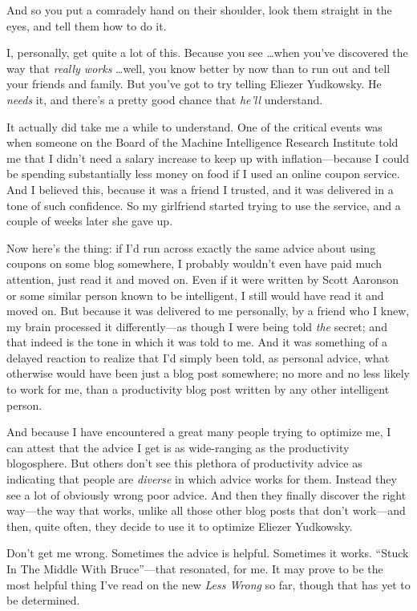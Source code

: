 {
 And so you put a comradely hand on their shoulder, look them
straight in the eyes, and tell them how to do it.}

{
 I, personally, get quite a lot of this. Because you see \ldots when
you've discovered the way that \textit{really works}
\ldots well, you know better by now than to run out and tell your
friends and family. But you've got to try telling
Eliezer Yudkowsky. He \textit{needs} it, and there's a
pretty good chance that \textit{he'll} understand.}

{
 It actually did take me a while to understand. One of the critical
events was when someone on the Board of the Machine Intelligence
Research Institute told me that I didn't need a salary
increase to keep up with inflation---because I could be spending
substantially less money on food if I used an online coupon service.
And I believed this, because it was a friend I trusted, and it was
delivered in a tone of such confidence. So my girlfriend started trying
to use the service, and a couple of weeks later she gave up.}

{
 Now here's the thing: if I'd run
across exactly the same advice about using coupons on some blog
somewhere, I probably wouldn't even have paid much
attention, just read it and moved on. Even if it were written by Scott
Aaronson or some similar person known to be intelligent, I still would
have read it and moved on. But because it was delivered to me
personally, by a friend who I knew, my brain processed it
differently---as though I were being told \textit{the} secret; and that
indeed is the tone in which it was told to me. And it was something of
a delayed reaction to realize that I'd simply been
told, as personal advice, what otherwise would have been just a blog
post somewhere; no more and no less likely to work for me, than a
productivity blog post written by any other intelligent person.}

{
 And because I have encountered a great many people trying to
optimize me, I can attest that the advice I get is as wide-ranging as
the productivity blogosphere. But others don't see this
plethora of productivity advice as indicating that people are
\textit{diverse} in which advice works for them. Instead they see a lot
of obviously wrong poor advice. And then they finally discover the
right way---the way that works, unlike all those other blog posts that
don't work---and then, quite often, they decide to use
it to optimize Eliezer Yudkowsky.}

{
 Don't get me wrong. Sometimes the advice is
helpful. Sometimes it works. ``Stuck In The Middle
With Bruce''{}---that resonated, for me. It may prove
to be the most helpful thing I've read on the new
\textit{Less Wrong} so far, though that has yet to be determined.}

